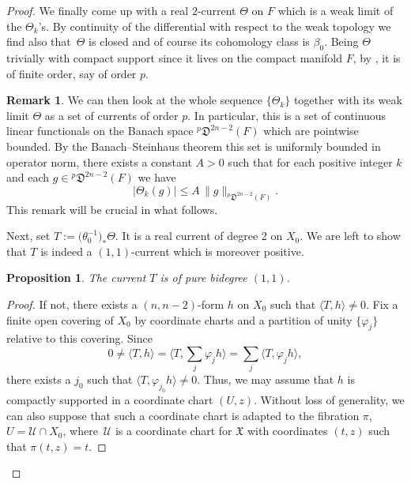 \documentclass[JEP,XML,SOM,Unicode,NoEqCountersInSection,published]{cedram}
\let\mathcal\mathscr
\theoremstyle{plain}
\newtheorem{proposition}[theorem]{Proposition}
\theoremstyle{definition}
\newtheorem{remark}[theorem]{Remark}
\begin{document}
\begin{appendix}
\begin{proof}
We finally come up with a real $2$-current $\Theta$ on $F$ which is a weak limit of the $\Theta_k$'s. By continuity of the differential with respect to the weak topology we find also that~$\Theta$ is closed and of course its cohomology class is $\beta_0$. Being $\Theta$ trivially with compact support since it lives on the compact manifold $F$, by \cite[Cor.\ on p.\,43]{dRh84}, it is of finite order, say of order $p$.

\begin{remark}\label{rk:BS}
We can then look at the whole sequence $\{\Theta_k\}$ together with its weak limit $\Theta$ as a set of currents of order $p$. In particular, this is a set of continuous linear functionals on the Banach space $^p\mathfrak D^{2n-2}(F)$ which are pointwise bounded. By the Banach--Steinhaus theorem this set is uniformly bounded in operator norm, \ie there exists a constant $A>0$ such that for each positive integer $k$ and each $g\in{}^p\mathfrak D^{2n-2}(F)$ we have
\[
|\Theta_k(g)|\le A\, \|g\|_{^p\mathfrak D^{2n-2}(F)}.
\]
This remark will be crucial in what follows.
\end{remark}

Next, set $T:=\bigl(\theta_0^{-1}\bigr)_*\Theta$. It is a real current of degree 2 on $X_0$. We are left to show that $T$ is indeed a $(1,1)$-current which is moreover positive.

\begin{proposition}
The current $T$ is of pure bidegree $(1,1)$.
\end{proposition}

\begin{proof}
If not, there exists a $(n,n-2)$-form $h$ on $X_0$ such that $\langle T,h\rangle\ne 0$. Fix a finite open covering of $X_0$ by coordinate charts and a partition of unity $\{\varphi_j\}$ relative to this covering. Since
\[
0\ne\langle T,h\rangle=\bigl\langle T,{\textstyle\sum_j\varphi_jh}\bigr\rangle=\sum_j\langle T,\varphi_jh\rangle,
\]
there exists a $j_0$ such that $\langle T,\varphi_{j_0}h\rangle\ne 0$. Thus, we may assume that $h$ is compactly supported in a coordinate chart $(U,z)$. Without loss of generality, we can also suppose that such a coordinate chart is adapted to the fibration $\pi$, \ie $U=\mathcal U\cap X_0$, where~$\mathcal U$ is a coordinate chart for $\mathfrak X$ with coordinates $(t,z)$ such that $\pi(t,z)=t$.


\end{proof}
\end{proof}
\end{appendix}
\end{document}
